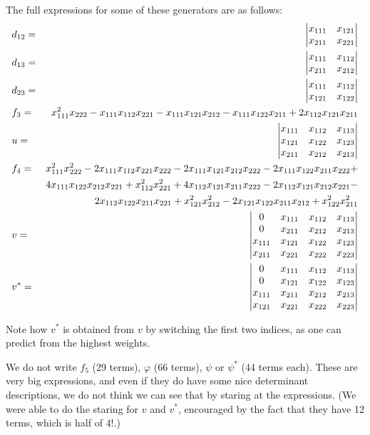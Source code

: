 \documentclass[reqno,11pt]{amsart}
\theoremstyle{remark}
\theoremstyle{definition}
\numberwithin{equation}{section}
\begin{document}
The full expressions for some of these generators are as follows:
\begin{eqnarray*}
	& d_{12}=&\left|\begin{matrix} x_{111} & x_{121}\cr x_{211} & x_{221}\end{matrix}\right| \\
	& d_{13}=&\left|\begin{matrix} x_{111} & x_{112}\cr x_{211} & x_{212}\end{matrix}\right| \\
	& d_{23}=&\left|\begin{matrix} x_{111} & x_{112}\cr x_{121} & x_{122}\end{matrix}\right| \\
	& f_3 =& x_{111}^2x_{222}-x_{111}x_{112}x_{221}-x_{111}x_{121}x_{212}-x_{111}x_{122}x_{211} +2 x_{112}x_{121}x_{211} \\
	& u =& \left|\begin{matrix} x_{111} & x_{112} & x_{113} \cr
		x_{121} & x_{122} & x_{123}\cr
		x_{211} & x_{212} & x_{213}
	\end{matrix}\right| 
	\\
	& f_4 =& x_{111}^2 x_{222}^2 -2x_{111}x_{112}x_{221}x_{222} -2x_{111}x_{121}x_{212}x_{222}-2x_{111}x_{122}x_{211}x_{222}
	+\\
	&& 4x_{111}x_{122}x_{212}x_{221}+x_{112}^2 x_{221}^2+4x_{112}x_{121}x_{211}x_{222}-2x_{112}x_{121}x_{212}x_{221}-\\&& 2x_{112}x_{122}x_{211}x_{221}+x_{121}^2x_{212}^2-2x_{121}x_{122}x_{211}x_{212}+x_{122}^2x_{211}^2\\
	& v =& \left|\begin{matrix} 0&x_{111} & x_{112} & x_{113} \cr
		0&x_{211} & x_{212} & x_{213}\cr
		x_{111}&x_{121} & x_{122} & x_{123}\cr
		x_{211}&x_{221} & x_{222} & x_{223}
	\end{matrix}\right| \\
	& v^* =& \left|\begin{matrix} 0&x_{111} & x_{112} & x_{113} \cr
		0&x_{121} & x_{122} & x_{123}\cr
		x_{111}&x_{211} & x_{212} & x_{213}\cr
		x_{121}&x_{221} & x_{222} & x_{223}
	\end{matrix}\right|
\end{eqnarray*}

Note how $v^*$ is obtained from $v$ by switching the first two indices, as one can predict from the highest weights.

We do not write $f_5$ (29 terms), $\varphi$ (66 terms), $\psi$ or $\psi^*$ (44 terms each). These are very big expressions, and even if they do have some nice determinant descriptions, we do not think we can see that by staring at the expressions. (We were able to do the staring for $v$ and $v^*$, encouraged by the fact that they have 12 terms, which is half of $4!$.)
\end{document}
